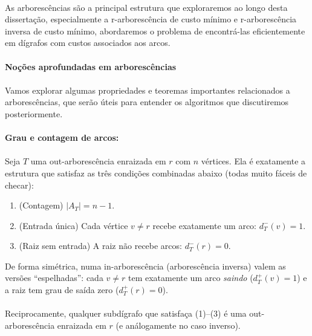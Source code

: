 \documentclass[12pt,a4paper]{article}
\begin{document}
\paragraph{}
As arborescências são a principal estrutura que exploraremos ao longo desta dissertação, especialmente a r-arborescência de custo mínimo e r-arborescência inversa de custo mínimo, abordaremos o problema de encontrá-las eficientemente em dígrafos com custos associados aos arcos.



\paragraph{Noções aprofundadas em arborescências}

\paragraph{}
Vamos explorar algumas propriedades e teoremas importantes relacionados a arborescências, que serão úteis para entender os algoritmos que discutiremos posteriormente.

\paragraph{Grau e contagem de arcos:}
\paragraph{}
Seja $T$ uma out-arborescência enraizada em $r$ com $n$ vértices. Ela é exatamente a estrutura que satisfaz as três condições combinadas abaixo (todas muito fáceis de checar):
\begin{enumerate}\setlength{\itemsep}{2pt}
    \item (Contagem) $|A_T| = n-1$.
    \item (Entrada única) Cada vértice $v\neq r$ recebe exatamente um arco: $d_T^-(v)=1$.
    \item (Raiz sem entrada) A raiz não recebe arcos: $d_T^-(r)=0$.
\end{enumerate}
De forma simétrica, numa in-arborescência (arborescência inversa) valem as versões “espelhadas”: cada $v\neq r$ tem exatamente um arco \emph{saindo} ($d_T^+(v)=1$) e a raiz tem grau de saída zero ($d_T^+(r)=0$).

\paragraph{}
Reciprocamente, qualquer subdígrafo que satisfaça (1)--(3) é uma out-arborescência enraizada em $r$ (e análogamente no caso inverso). 
\end{document}
